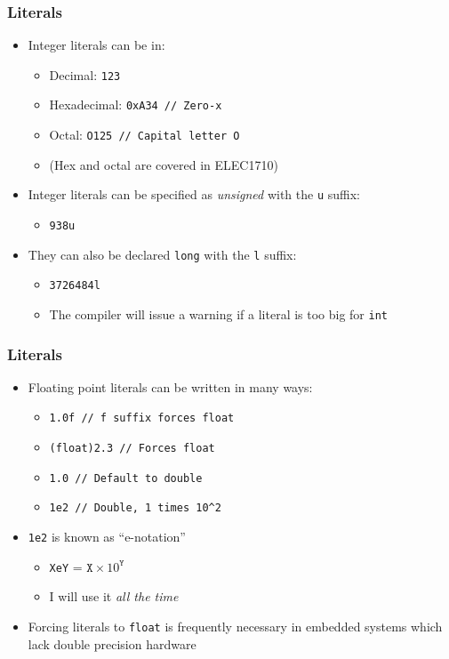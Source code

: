\documentclass[14pt]{beamer}
\begin{document}
\begin{frame}
\frametitle{Literals}
\begin{itemize}
\item Integer literals can be in:
	\begin{itemize}
		\item Decimal: \texttt{123}
		\item Hexadecimal: \texttt{0xA34 // Zero-x}
		\item Octal: \texttt{O125 // Capital letter O}
		\item (Hex and octal are covered in ELEC1710)
	\end{itemize}
\item Integer literals can be specified as \textit{unsigned} with the \texttt{u} suffix:
	\begin{itemize}
		\item \texttt{938u}
	\end{itemize}
\item They can also be declared \texttt{long} with the \texttt{l} suffix:
	\begin{itemize}
		\item \texttt{3726484l}
		\item The compiler will issue a warning if a literal is too big for \texttt{int}
	\end{itemize}
\end{itemize}
\end{frame}

\begin{frame}
\frametitle{Literals}
\begin{itemize}
\item Floating point literals can be written in many ways:
	\begin{itemize}
		\item \texttt{1.0f // f suffix forces float}
		\item \texttt{(float)2.3 // Forces float}
		\item \texttt{1.0 // Default to double}
		\item \texttt{1e2 // Double, 1 times 10\^{}2}
	\end{itemize}
\item \texttt{1e2} is known as ``e-notation''
	\begin{itemize}
		\item \texttt{XeY} = $\texttt{X} \times 10^\texttt{Y}$
		\item I will use it \textit{all the time}
	\end{itemize}
\item Forcing literals to \texttt{float} is frequently necessary in embedded systems which lack double precision hardware
\end{itemize}
\end{frame}
\end{document}
